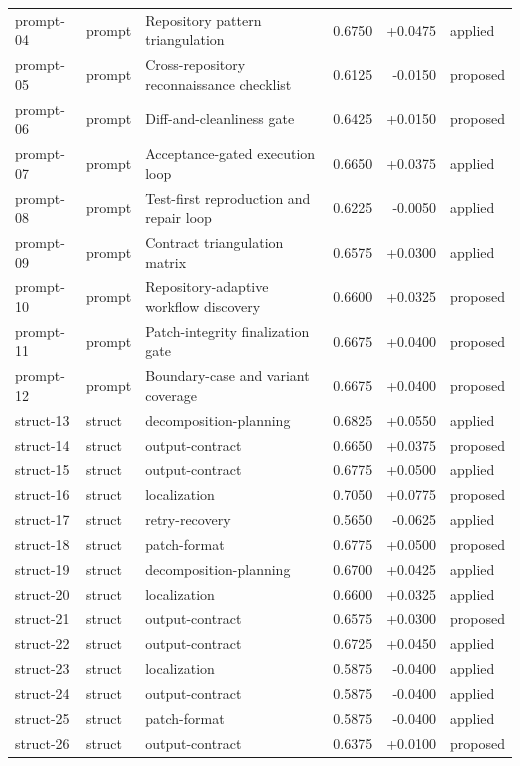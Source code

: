 \begin{center}
\begin{longtable}{llp{5.2cm}rrl}
prompt-04 & prompt & Repository pattern triangulation & 0.6750 & +0.0475 & applied \\
prompt-05 & prompt & Cross-repository reconnaissance checklist & 0.6125 & -0.0150 & proposed \\
prompt-06 & prompt & Diff-and-cleanliness gate & 0.6425 & +0.0150 & proposed \\
prompt-07 & prompt & Acceptance-gated execution loop & 0.6650 & +0.0375 & applied \\
prompt-08 & prompt & Test-first reproduction and repair loop & 0.6225 & -0.0050 & applied \\
prompt-09 & prompt & Contract triangulation matrix & 0.6575 & +0.0300 & applied \\
prompt-10 & prompt & Repository-adaptive workflow discovery & 0.6600 & +0.0325 & proposed \\
prompt-11 & prompt & Patch-integrity finalization gate & 0.6675 & +0.0400 & proposed \\
prompt-12 & prompt & Boundary-case and variant coverage & 0.6675 & +0.0400 & proposed \\
struct-13 & struct & decomposition-planning & 0.6825 & +0.0550 & applied \\
struct-14 & struct & output-contract & 0.6650 & +0.0375 & proposed \\
struct-15 & struct & output-contract & 0.6775 & +0.0500 & applied \\
struct-16 & struct & localization & 0.7050 & +0.0775 & proposed \\
struct-17 & struct & retry-recovery & 0.5650 & -0.0625 & applied \\
struct-18 & struct & patch-format & 0.6775 & +0.0500 & proposed \\
struct-19 & struct & decomposition-planning & 0.6700 & +0.0425 & applied \\
struct-20 & struct & localization & 0.6600 & +0.0325 & applied \\
struct-21 & struct & output-contract & 0.6575 & +0.0300 & proposed \\
struct-22 & struct & output-contract & 0.6725 & +0.0450 & applied \\
struct-23 & struct & localization & 0.5875 & -0.0400 & applied \\
struct-24 & struct & output-contract & 0.5875 & -0.0400 & applied \\
struct-25 & struct & patch-format & 0.5875 & -0.0400 & applied \\
struct-26 & struct & output-contract & 0.6375 & +0.0100 & proposed \\

\end{longtable}
\end{center}
